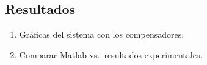 \subsection{Resultados}
\begin{enumerate}[label=5.\arabic*.]
	\item Gráficas del sistema con los compensadores.
	\item Comparar Matlab vs.\ resultados experimentales.
\end{enumerate}
